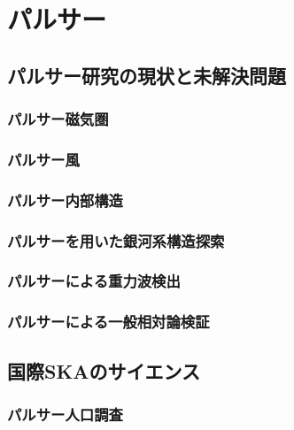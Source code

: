 \documentclass[a4j,twoside,11pt]{jreport}
\begin{document}
\chapter{パルサー}\label{pulsar}




\section{パルサー研究の現状と未解決問題}\label{pulsar.s1}

\subsection{パルサー磁気圏}

\subsection{パルサー風}

\subsection{パルサー内部構造}

\subsection{パルサーを用いた銀河系構造探索}

\subsection{パルサーによる重力波検出}

\subsection{パルサーによる一般相対論検証}



\newpage

\section{国際SKAのサイエンス}\label{pulsar.s2}

\subsection{パルサー人口調査}
\end{document}
